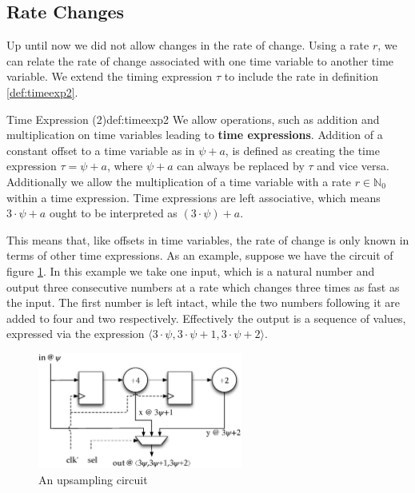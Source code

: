 \subsection{Rate Changes}
Up until now we did not allow changes in the rate of change.
Using a rate $r$, we can relate the rate of change associated with one time variable to another time variable.
We extend the timing expression $\tau$ to include the rate in definition \ref{def:timeexp2}.

\begin{definitiontitled}{Time Expression (2)}{def:timeexp2}
We allow operations, such as addition and multiplication on time variables leading to \textbf{time expressions}.
Addition of a constant offset to a time variable as in $\psi + a$, is defined as creating the time expression $\tau= \psi + a$, where $\psi + a$ can always be replaced by $\tau$ and vice versa.
Additionally we allow the multiplication of a time variable with a rate $r \in \mathbb{N}_0$ within a time expression.
Time expressions are left associative, which means $3 \cdot \psi + a$ ought to be interpreted as $(3 \cdot \psi) + a$.
\end{definitiontitled}

This means that, like offsets in time variables, the rate of change is only known in terms of other time expressions.
As an example, suppose we have the circuit of figure \ref{fig:ratechange}.
In this example we take one input, which is a natural number and output three consecutive numbers at a rate which changes three times as fast as the input.
The first number is left intact, while the two numbers following it are added to four and two respectively.
Effectively the output is a sequence of values, expressed via the expression $\langle 3 \cdot \psi, 3 \cdot \psi + 1, 3 \cdot \psi + 2 \rangle$.

\begin{figure}[h]
\centering
\includegraphics[width=0.6\textwidth]{images/ratechange}
\caption{An upsampling circuit}
\label{fig:ratechange}
\end{figure}

